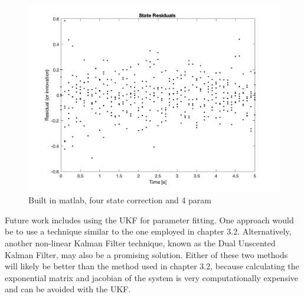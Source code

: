 \begin{figure}[h]
    \centering
    \includegraphics[scale = 0.6]{UKF_4param_residual.png}
    \caption{Built in matlab, four state correction and 4 param}
    \label{fig:4params}
\end{figure}

\noindent Future work includes using the UKF for parameter fitting. One approach would be to use a technique similar to the one employed in chapter 3.2. Alternatively, another non-linear Kalman Filter technique, known as the Dual Unscented Kalman Filter, may also be a promising solution. Either of these two methods will likely be better than the method used in chapter 3.2, because calculating the exponential matrix and jacobian of the system is very computationally expensive and can be avoided with the UKF.














